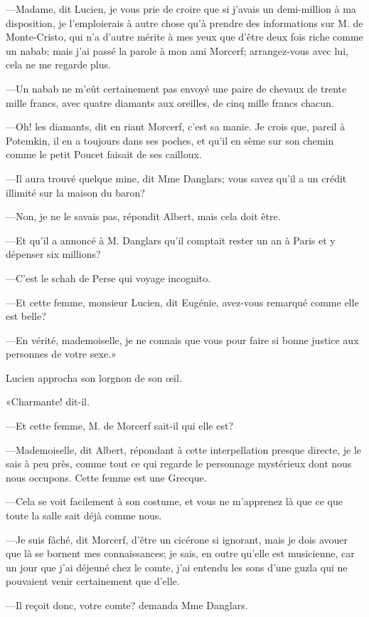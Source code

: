 —Madame, dit Lucien, je vous prie de croire que si j'avais un demi-million à ma disposition, je l'emploierais à autre chose qu'à prendre des informations sur M. de Monte-Cristo, qui n'a d'autre mérite à mes yeux que d'être deux fois riche comme un nabab; mais j'ai passé la parole à mon ami Morcerf; arrangez-vous avec lui, cela ne me regarde plus. 

—Un nabab ne m'eût certainement pas envoyé une paire de chevaux de trente mille francs, avec quatre diamants aux oreilles, de cinq mille francs chacun. 

—Oh! les diamants, dit en riant Morcerf, c'est sa manie. Je crois que, pareil à Potemkin, il en a toujours dans ses poches, et qu'il en sème sur son chemin comme le petit Poucet faisait de ses cailloux. 

—Il aura trouvé quelque mine, dit Mme Danglars; vous savez qu'il a un crédit illimité sur la maison du baron? 

—Non, je ne le savais pas, répondit Albert, mais cela doit être. 

—Et qu'il a annoncé à M. Danglars qu'il comptait rester un an à Paris et y dépenser six millions? 

—C'est le schah de Perse qui voyage incognito. 

—Et cette femme, monsieur Lucien, dit Eugénie, avez-vous remarqué comme elle est belle? 

—En vérité, mademoiselle, je ne connais que vous pour faire si bonne justice aux personnes de votre sexe.» 

Lucien approcha son lorgnon de son œil. 

«Charmante! dit-il. 

—Et cette femme, M. de Morcerf sait-il qui elle est? 

—Mademoiselle, dit Albert, répondant à cette interpellation presque directe, je le sais à peu près, comme tout ce qui regarde le personnage mystérieux dont nous nous occupons. Cette femme est une Grecque. 

—Cela se voit facilement à son costume, et vous ne m'apprenez là que ce que toute la salle sait déjà comme nous. 

—Je suis fâché, dit Morcerf, d'être un cicérone si ignorant, mais je dois avouer que là se bornent mes connaissances; je sais, en outre qu'elle est musicienne, car un jour que j'ai déjeuné chez le comte, j'ai entendu les sons d'une guzla qui ne pouvaient venir certainement que d'elle. 

—Il reçoit donc, votre comte? demanda Mme Danglars. 

